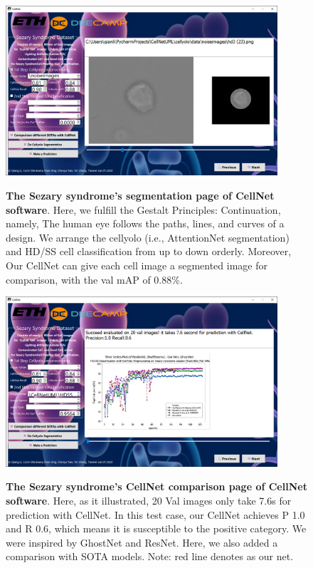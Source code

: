 \begin{figure}[t]
\begin{center}
\includegraphics[height=0.3\textheight,width=0.9\textwidth]{thesis-template-master/images/cellnet5-1page.PNG}
\label{fig:cellnet}
\end{center}
\caption{ \textbf{The Sezary syndrome's segmentation page of CellNet software}. Here, we fulfill the Gestalt Principles: Continuation, namely, The human eye follows the paths, lines, and curves of a design. We arrange the cellyolo (i.e., AttentionNet segmentation) and HD/SS cell classification from up to down orderly. Moreover, Our CellNet can give each cell image a segmented image for comparison, with the val mAP of 0.88\%.}
\label{fig:6.13}
\end{figure}


\begin{figure}[t]
\begin{center}
\includegraphics[height=0.3\textheight,width=0.9\textwidth]{thesis-template-master/images/cellnet5-2page.PNG}
\label{fig:cellnet}
\end{center}
\caption{ \textbf{The Sezary syndrome's CellNet comparison page of CellNet software}. Here, as it illustrated, 20 Val images only take 7.6s  for prediction with CellNet. In this test case, our CellNet achieves P 1.0 and R 0.6, which means it is susceptible to the positive category. We were inspired by GhostNet\cite{19} and ResNet\cite{20}. Here, we also added a comparison with SOTA models. Note: red line denotes as our net. }
\label{fig:6.14}
\end{figure}

